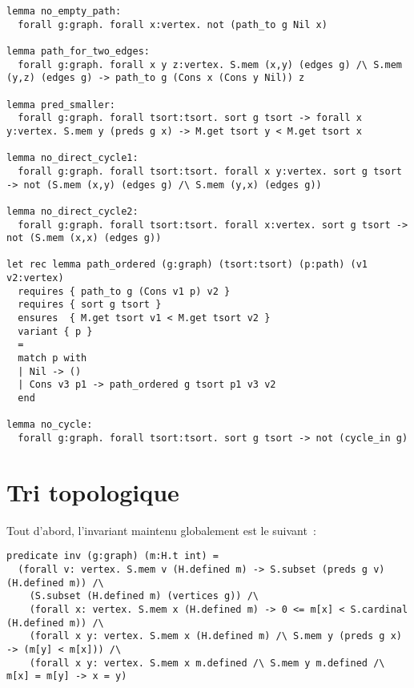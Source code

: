 \documentclass[a4paper,10pt]{article}
\begin{document}
\begin{lstlisting}
lemma no_empty_path:
  forall g:graph. forall x:vertex. not (path_to g Nil x)

lemma path_for_two_edges:
  forall g:graph. forall x y z:vertex. S.mem (x,y) (edges g) /\ S.mem (y,z) (edges g) -> path_to g (Cons x (Cons y Nil)) z

lemma pred_smaller:
  forall g:graph. forall tsort:tsort. sort g tsort -> forall x y:vertex. S.mem y (preds g x) -> M.get tsort y < M.get tsort x

lemma no_direct_cycle1:
  forall g:graph. forall tsort:tsort. forall x y:vertex. sort g tsort -> not (S.mem (x,y) (edges g) /\ S.mem (y,x) (edges g))

lemma no_direct_cycle2:
  forall g:graph. forall tsort:tsort. forall x:vertex. sort g tsort -> not (S.mem (x,x) (edges g))

let rec lemma path_ordered (g:graph) (tsort:tsort) (p:path) (v1 v2:vertex)
  requires { path_to g (Cons v1 p) v2 }
  requires { sort g tsort }
  ensures  { M.get tsort v1 < M.get tsort v2 }
  variant { p }
  =
  match p with
  | Nil -> ()
  | Cons v3 p1 -> path_ordered g tsort p1 v3 v2
  end

lemma no_cycle:
  forall g:graph. forall tsort:tsort. sort g tsort -> not (cycle_in g)
\end{lstlisting}

\section{Tri topologique}

Tout d'abord, l'invariant maintenu globalement est le suivant~:
\begin{lstlisting}
predicate inv (g:graph) (m:H.t int) =
  (forall v: vertex. S.mem v (H.defined m) -> S.subset (preds g v) (H.defined m)) /\
	(S.subset (H.defined m) (vertices g)) /\
	(forall x: vertex. S.mem x (H.defined m) -> 0 <= m[x] < S.cardinal (H.defined m)) /\
	(forall x y: vertex. S.mem x (H.defined m) /\ S.mem y (preds g x) -> (m[y] < m[x])) /\
	(forall x y: vertex. S.mem x m.defined /\ S.mem y m.defined /\ m[x] = m[y] -> x = y)
\end{lstlisting}
\end{document}
